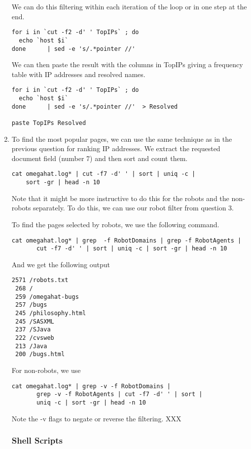 \begin{enumerate}
We can do this filtering within each iteration of the
loop or in one step at the end.
\begin{verbatim}
for i in `cut -f2 -d' ' TopIPs` ; do
  echo `host $i`
done      | sed -e 's/.*pointer //' 
\end{verbatim}

We can then paste the result with the columns in
TopIPs giving a frequency table with IP addresses
and resolved names.
\begin{verbatim}
for i in `cut -f2 -d' ' TopIPs` ; do
  echo `host $i`
done      | sed -e 's/.*pointer //'  > Resolved

paste TopIPs Resolved
\end{verbatim}


\item  %
To find the most popular pages, we can use the same technique as in
the previous question for ranking IP addresses.
We extract the requested document field (number 7)
and then sort and count them.
\begin{verbatim}
cat omegahat.log* | cut -f7 -d' ' | sort | uniq -c | 
    sort -gr | head -n 10
\end{verbatim}

Note that it might be more instructive to do this for 
the robots and the non-robots separately.
To do this, we can use our robot filter from question 3.

To find the pages selected by robots, we use the following command.
\begin{verbatim}
cat omegahat.log* | grep  -f RobotDomains | grep -f RobotAgents |  
       cut -f7 -d' ' | sort | uniq -c | sort -gr | head -n 10
\end{verbatim}
And we get the following output 
\begin{verbatim}
2571 /robots.txt
 268 /
 259 /omegahat-bugs
 257 /bugs
 245 /philosophy.html
 245 /SASXML
 237 /SJava
 222 /cvsweb
 213 /Java
 200 /bugs.html
\end{verbatim}

For non-robots, we use 
\begin{verbatim}
cat omegahat.log* | grep -v -f RobotDomains | 
       grep -v -f RobotAgents | cut -f7 -d' ' | sort | 
       uniq -c | sort -gr | head -n 10
\end{verbatim}
Note the -v flags to negate or reverse the filtering.
XXX


\subsubsection{Shell Scripts}



\end{enumerate}
